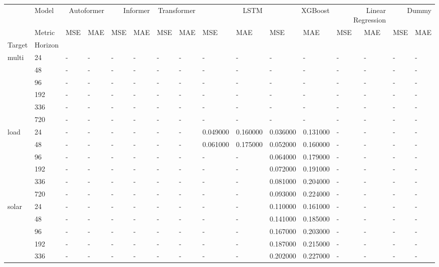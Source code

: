 \begin{tabular}{llllllllllllllll}
\toprule
 & Model & \multicolumn{2}{r}{Autoformer} & \multicolumn{2}{r}{Informer} & \multicolumn{2}{r}{Transformer} & \multicolumn{2}{r}{LSTM} & \multicolumn{2}{r}{XGBoost} & \multicolumn{2}{r}{Linear Regression} & \multicolumn{2}{r}{Dummy} \\
 & Metric & MSE & MAE & MSE & MAE & MSE & MAE & MSE & MAE & MSE & MAE & MSE & MAE & MSE & MAE \\
Target & Horizon &  &  &  &  &  &  &  &  &  &  &  &  &  &  \\
\midrule
\multirow[t]{6}{*}{multi} & 24 & - & - & - & - & - & - & - & - & - & - & - & - & - & - \\
 & 48 & - & - & - & - & - & - & - & - & - & - & - & - & - & - \\
 & 96 & - & - & - & - & - & - & - & - & - & - & - & - & - & - \\
 & 192 & - & - & - & - & - & - & - & - & - & - & - & - & - & - \\
 & 336 & - & - & - & - & - & - & - & - & - & - & - & - & - & - \\
 & 720 & - & - & - & - & - & - & - & - & - & - & - & - & - & - \\
\cline{1-16}
\multirow[t]{6}{*}{load} & 24 & - & - & - & - & - & - & 0.049000 & 0.160000 & 0.036000 & 0.131000 & - & - & - & - \\
 & 48 & - & - & - & - & - & - & 0.061000 & 0.175000 & 0.052000 & 0.160000 & - & - & - & - \\
 & 96 & - & - & - & - & - & - & - & - & 0.064000 & 0.179000 & - & - & - & - \\
 & 192 & - & - & - & - & - & - & - & - & 0.072000 & 0.191000 & - & - & - & - \\
 & 336 & - & - & - & - & - & - & - & - & 0.081000 & 0.204000 & - & - & - & - \\
 & 720 & - & - & - & - & - & - & - & - & 0.093000 & 0.224000 & - & - & - & - \\
\cline{1-16}
\multirow[t]{6}{*}{solar} & 24 & - & - & - & - & - & - & - & - & 0.110000 & 0.161000 & - & - & - & - \\
 & 48 & - & - & - & - & - & - & - & - & 0.141000 & 0.185000 & - & - & - & - \\
 & 96 & - & - & - & - & - & - & - & - & 0.167000 & 0.203000 & - & - & - & - \\
 & 192 & - & - & - & - & - & - & - & - & 0.187000 & 0.215000 & - & - & - & - \\
 & 336 & - & - & - & - & - & - & - & - & 0.202000 & 0.227000 & - & - & - & - \\

\end{tabular}
